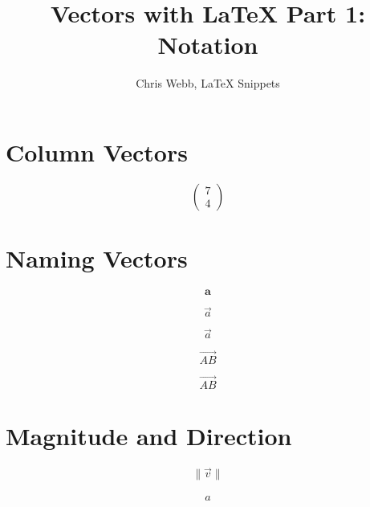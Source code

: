 \documentclass{article}
\title{Vectors with LaTeX Part 1: Notation}
\author{Chris Webb, LaTeX Snippets}
\begin{document}
\maketitle


\section{Column Vectors}

\[
\begin{pmatrix}
7 \\
4
\end{pmatrix}
\]


\section{Naming Vectors}

\[
\mathbf{a}
\]

\[
\vec{a}
\]

\[
\overrightarrow{a}
\]

\[
\vec{AB}
\]

\[
\overrightarrow{AB}
\]


\section{Magnitude and Direction}

\[
\| \vec{v} \|
\]

\[
\hat{a}
\]
\end{document}
